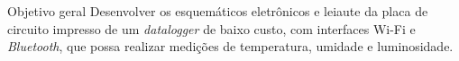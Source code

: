 \begin{frame}{Objetivo geral}
    Desenvolver os esquemáticos eletrônicos e leiaute da placa de circuito impresso de um \textit{datalogger} de baixo custo, com interfaces Wi-Fi e \textit{Bluetooth}, que possa realizar medições de temperatura, umidade e luminosidade. 
    
    
    
    
    

    


\end{frame}




    
